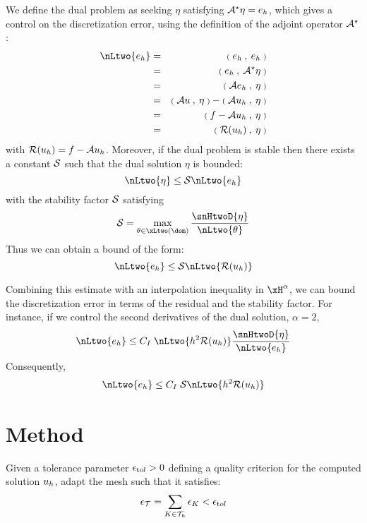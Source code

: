 We define the dual problem as seeking $\eta$ satisfying $\mathcal{A}^\star\eta = e_h$, which gives a control on the discretization error, using the definition of the adjoint operator $\mathcal{A}^\star$:
\begin{eqnarray*}
\nLtwo{e_h} &=& \Inner{e_h}{e_h}\\
            &=& \Inner{e_h}{\opA^\star\eta}\\
            &=& \Inner{\opA e_h}{\eta}\\
            &=& \Inner{\opA u}{\eta} - \Inner{\opA \uh}{\eta}\\
            &=& \Inner{f - \opA \uh}{\eta}\\
            &=& \Inner{\Res \uh}{\eta}
\end{eqnarray*}
with ${\mathcal{R}({u_h})} = f -  \mathcal{A} {u_h}$. Moreover, if the dual problem is stable then there exists a constant $\mathcal{S}$ such that the dual solution $\eta$ is bounded:
\begin{equation*}
\nLtwo{\eta} \leq \Stab \nLtwo{e_h}
\end{equation*}
with the stability factor $\mathcal{S}$ satisfying
\begin{equation*}
\Stab = \max_{\theta\in\xLtwo(\dom)}\dfrac{\snHtwoD{\eta}}{\nLtwo{\theta}}
\end{equation*}
Thus we can obtain a bound of the form:
\begin{equation*}
\nLtwo{e_h} \leq \Stab \nLtwo{\Res \uh}
\end{equation*}

\medskip
Combining this estimate with an interpolation inequality in $\xH^\alpha$, we can bound the discretization error in terms of the residual and the stability factor.
For instance, if we control the second derivatives of the dual solution, \ie $\alpha = 2$,
\begin{eqnarray*}
\nLtwo{e_h} \leq C_I\;\nLtwo{h^2\Res \uh}\dfrac{\snHtwoD{\eta}}{\nLtwo{e_h}}
\end{eqnarray*}
Consequently,
\begin{eqnarray*}
\nLtwo{e_h} \leq C_I\;\Stab\nLtwo{h^2\Res \uh}
\end{eqnarray*}

\section{Method}

\begin{dfntn}[$h$-adaptivity]
Given a tolerance parameter $\epsilon_{\mathrm tol} > 0$ defining a quality criterion for the computed solution ${u_h}$, adapt the mesh such that it satisfies:
\begin{equation*}
\epsilon_{\mathcal T} = \sum_{K\in{\mathcal T}_h} \epsilon_K < \epsilon_{\mathrm tol}
\end{equation*}
\end{dfntn}

